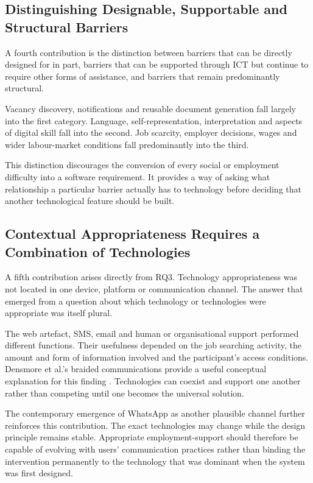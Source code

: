 \subsection{Distinguishing Designable, Supportable and Structural Barriers}

A fourth contribution is the distinction between barriers that can be directly designed for in part, barriers that can be supported through ICT but continue to require other forms of assistance, and barriers that remain predominantly structural.

Vacancy discovery, notifications and reusable document generation fall largely into the first category. Language, self-representation, interpretation and aspects of digital skill fall into the second. Job scarcity, employer decisions, wages and wider labour-market conditions fall predominantly into the third.

This distinction discourages the conversion of every social or employment difficulty into a software requirement. It provides a way of asking what relationship a particular barrier actually has to technology before deciding that another technological feature should be built.


\subsection{Contextual Appropriateness Requires a Combination of Technologies}

A fifth contribution arises directly from RQ3. Technology appropriateness was not located in one device, platform or communication channel. The answer that emerged from a question about which technology or technologies were appropriate was itself plural.

The web artefact, SMS, email and human or organisational support performed different functions. Their usefulness depended on the job searching activity, the amount and form of information involved and the participant's access conditions. Densmore et al.'s braided communications provide a useful conceptual explanation for this finding \cite{densmore2013}. Technologies can coexist and support one another rather than competing until one becomes the universal solution.

The contemporary emergence of WhatsApp as another plausible channel further reinforces this contribution. The exact technologies may change while the design principle remains stable. Appropriate employment-support should therefore be capable of evolving with users' communication practices rather than binding the intervention permanently to the technology that was dominant when the system was first designed.



